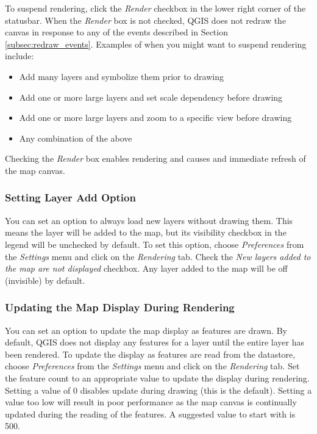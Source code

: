 To suspend rendering, click the \textit{Render} checkbox in the lower right
corner of the statusbar. When the \textit{Render} box is not checked, QGIS
does not redraw the canvas in response to any of the events described in
Section \ref{subsec:redraw_events}. Examples of when you might want to suspend
rendering include:

\begin{itemize}
\item Add many layers and symbolize them prior to drawing
\item Add one or more large layers and set scale dependency before drawing
\item Add one or more large layers and zoom to a specific view before
drawing
\item Any combination of the above
\end{itemize}

Checking the \textit{Render} box enables rendering and causes and immediate
refresh of the map canvas.

\subsubsection{Setting Layer Add Option}\label{label_settinglayer}

You can set an option to always load new layers without drawing them. This
means the layer will be added to the map, but its visibility checkbox in the
legend will be unchecked by default. To set this option, choose
\textit{Preferences} from the \textit{Settings} menu and click on the
\textit{Rendering} tab. Check the \textit{New layers added to the map are not
displayed} checkbox. Any layer added to the map will be off (invisible) by
default.

\subsubsection{Updating the Map Display During Rendering}
\label{label_updatemap}

You can set an option to update the map display as features are drawn. By
default, QGIS does not display any features for a layer until the entire
layer has been rendered. To update the display as features are read from the
datastore, choose \textit{Preferences} from the \textit{Settings} menu and
click on the \textit{Rendering} tab. Set the feature count to an
appropriate value to update the display during rendering. Setting a value of 0
disables update during drawing (this is the default). Setting a value too low
will result in poor performance as the map canvas is continually updated
during the reading of the features. A suggested value to start with is 500. 


